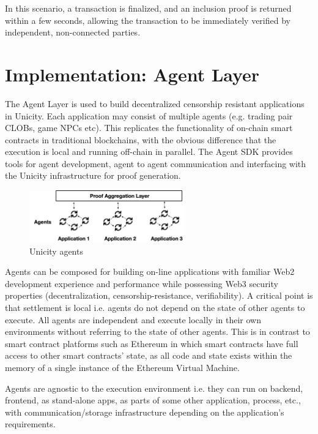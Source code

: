 \documentclass{article}
\begin{document}
In this scenario, a transaction is finalized, and an inclusion proof is returned within a few seconds, allowing the transaction to be immediately verified by independent, non-connected parties.

\section{Implementation: Agent Layer}

The Agent Layer is used to build decentralized censorship resistant applications in Unicity. Each application may consist of multiple agents (e.g. trading pair CLOBs, game NPCs etc). This replicates the functionality of on-chain smart contracts in traditional blockchains, with the obvious difference that the execution is local and running off-chain in parallel. The Agent SDK provides tools for agent development, agent to agent communication and interfacing with the Unicity infrastructure for proof generation.

\begin{figure}[ht]
    \centering
    \includegraphics[width=0.6\textwidth]{AgentContracts.png}
    \caption{Unicity agents}
    \label{fig:AgentContracts}
\end{figure}

Agents can be composed for building on-line applications with familiar Web2 development experience and performance while possessing Web3 security properties (decentralization, censorship-resistance, verifiability). A critical point is that settlement is local i.e. agents do not depend on the state of other agents to execute. All agents are independent and execute locally in their own environments without referring to the state of other agents. This is in contrast to smart contract platforms such as Ethereum in which smart contracts have full access to other smart contracts' state, as all code and state exists within the memory of a single instance of the Ethereum Virtual Machine.

Agents are agnostic to the execution environment i.e. they can run on backend, frontend, as stand-alone apps, as parts of some other application, process, etc., with communication/storage infrastructure depending on the application's requirements.
\end{document}
